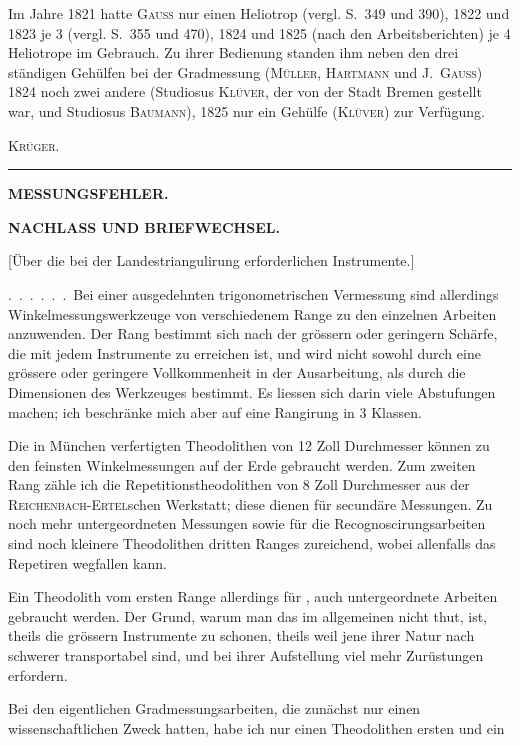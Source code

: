 Im Jahre 1821 hatte \textsc{Gauss} nur einen Heliotrop (vergl. S.~349 und 390), 1822 und 1823 je 3 (vergl.
S.~355 und 470), 1824 und 1825 (nach den Arbeitsberichten) je 4 Heliotrope im Gebrauch. Zu ihrer Bedienung
standen ihm neben den drei ständigen Gehülfen bei der Gradmessung (\textsc{Müller}, \textsc{Hartmann} und
\textsc{J.~Gauss}) 1824 noch zwei andere (Studiosus \textsc{Klüver}, der von der Stadt Bremen gestellt war, und Studiosus
\textsc{Baumann}), 1825 nur ein Gehülfe (\textsc{Klüver}) zur Verfügung.
\par\hfill\textsc{Krüger.}\par\endgroup
\vspace{20mm}
\begin{center}\rule{40mm}{.4pt}\end{center}

\clearpage
\vspace*{40mm}
\begin{center}{\Large\bfseries MESSUNGSFEHLER.}\end{center}
\clearpage\null\clearpage
\vspace*{14mm}
\begin{center}
{\Large\bfseries NACHLASS UND BRIEFWECHSEL.}\par\vspace{10mm}
[Über die bei der Landestriangulirung erforderlichen Instrumente.]
\end{center}
.\ .\ .\ .\ .\ .\ Bei einer ausgedehnten trigonometrischen Vermessung sind allerdings
Winkelmessungswerkzeuge von verschiedenem Range zu den einzelnen
Arbeiten anzuwenden. Der Rang bestimmt sich nach der grössern oder geringern
Schärfe, die mit jedem Instrumente zu erreichen ist, und wird nicht
sowohl durch eine grössere oder geringere Vollkommenheit in der Ausarbeitung,
als durch die Dimensionen des Werkzeuges bestimmt. Es liessen sich
darin viele Abstufungen machen; ich beschränke mich aber auf eine Rangirung
in 3 Klassen.

Die in München verfertigten Theodolithen von 12 Zoll Durchmesser können
zu den feinsten Winkelmessungen auf der Erde gebraucht werden. Zum zweiten
Rang zähle ich die Repetitionstheodolithen von 8 Zoll Durchmesser aus der
\textsc{Reichenbach-Ertel}schen Werkstatt; diese dienen für secundäre Messungen.
Zu noch mehr untergeordneten Messungen sowie für die Recognoscirungsarbeiten
sind noch kleinere Theodolithen dritten Ranges zureichend, wobei
allenfalls das Repetiren wegfallen kann.

Ein Theodolith vom ersten Range  allerdings für , auch
untergeordnete Arbeiten gebraucht werden. Der Grund, warum man das im
allgemeinen nicht thut, ist, theils die grössern Instrumente zu schonen, theils
weil jene ihrer Natur nach schwerer transportabel sind, und bei ihrer Aufstellung
viel mehr Zurüstungen erfordern.

Bei den eigentlichen Gradmessungsarbeiten, die zunächst nur einen wissenschaftlichen
Zweck hatten, habe ich nur einen Theodolithen ersten und ein
